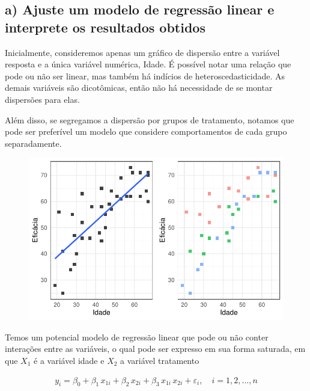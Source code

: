 \documentclass[
  letterpaper,
  DIV=11,
  numbers=noendperiod]{scrartcl}
\begin{document}
\hypertarget{a-ajuste-um-modelo-de-regressuxe3o-linear-e-interprete-os-resultados-obtidos}{%
\subsection{a) Ajuste um modelo de regressão linear e interprete os
resultados
obtidos}\label{a-ajuste-um-modelo-de-regressuxe3o-linear-e-interprete-os-resultados-obtidos}}

Inicialmente, consideremos apenas um gráfico de dispersão entre a
variável resposta e a única variável numérica, Idade. É possível notar
uma relação que pode ou não ser linear, mas também há indícios de
heteroscedasticidade. As demais variáveis são dicotômicas, então não há
necessidade de se montar dispersões para elas.

Além disso, se segregamos a dispersão por grupos de tratamento, notamos
que pode ser preferível um modelo que considere comportamentos de cada
grupo separadamente.

\begin{figure}

{\centering \includegraphics{lista2_files/figure-pdf/scatter-variaveis-1.pdf}

}

\end{figure}

Temos um potencial modelo de regressão linear que pode ou não conter
interações entre as variáveis, o qual pode ser expresso em sua forma
saturada, em que \(X_1\) é a variável idade e \(X_2\) a variável
tratamento

\begin{align}
  y_i = \beta_0 + \beta_1 \, x_{1i} + \beta_2 \, x_{2i} + \beta_3 \, x_{1i}\, x_{2i} + \varepsilon_i, \quad i = 1, 2, \dots, n
\end{align}
\end{document}
